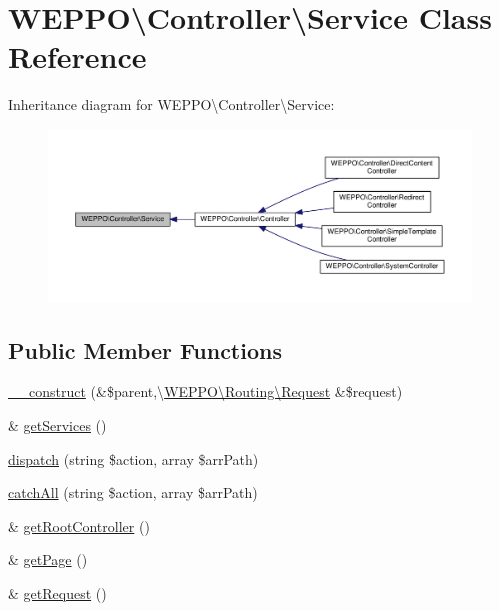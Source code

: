 \hypertarget{classWEPPO_1_1Controller_1_1Service}{}\section{W\+E\+P\+PO\textbackslash{}Controller\textbackslash{}Service Class Reference}
\label{classWEPPO_1_1Controller_1_1Service}


Inheritance diagram for W\+E\+P\+PO\textbackslash{}Controller\textbackslash{}Service\+:\nopagebreak
\begin{figure}[H]
\begin{center}
\leavevmode
\includegraphics[width=350pt]{classWEPPO_1_1Controller_1_1Service__inherit__graph}
\end{center}
\end{figure}
\subsection*{Public Member Functions}
\begin{DoxyCompactItemize}
\item 
\hyperlink{classWEPPO_1_1Controller_1_1Service_ab1df701c9be0cfac3d4f07772803a755}{\+\_\+\+\_\+construct} (\&\$parent,\textbackslash{}\hyperlink{classWEPPO_1_1Routing_1_1Request}{W\+E\+P\+P\+O\textbackslash{}\+Routing\textbackslash{}\+Request} \&\$request)
\item 
\& \hyperlink{classWEPPO_1_1Controller_1_1Service_acac4c44dde4f13d7d99de0f0f06dd059}{get\+Services} ()
\item 
\hyperlink{classWEPPO_1_1Controller_1_1Service_ab84cfaaa9aa55776dbe34acd468b82f2}{dispatch} (string \$action, array \$arr\+Path)
\item 
\hyperlink{classWEPPO_1_1Controller_1_1Service_a82d169a54fdd8353b430d519b2e3765a}{catch\+All} (string \$action, array \$arr\+Path)
\item 
\& \hyperlink{classWEPPO_1_1Controller_1_1Service_a0d6d038b799533b957a0b9e6509984d7}{get\+Root\+Controller} ()
\item 
\& \hyperlink{classWEPPO_1_1Controller_1_1Service_afb4522e177f5249ae72f6bceb208c755}{get\+Page} ()
\item 
\& \hyperlink{classWEPPO_1_1Controller_1_1Service_a3790f53e1f06e955a0f20e0fa06c46a4}{get\+Request} ()
\end{DoxyCompactItemize}
